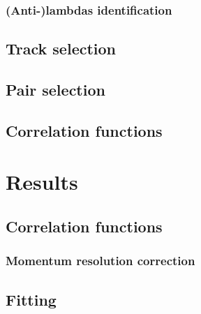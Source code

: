 \subsubsection{(Anti-)lambdas identification}


\subsection{Track selection}


\subsection{Pair selection}

\subsection{Correlation functions}


\section{Results}


\subsection{Correlation functions}


\subsubsection{Momentum resolution correction}


\subsection{Fitting}


